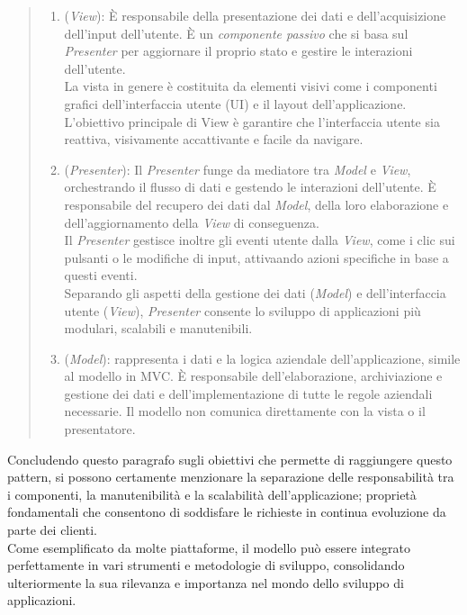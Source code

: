 \begin{quote}
\begin{enumerate}[label=\textit{\arabic*}]
\item (\textit{View}): È responsabile della presentazione dei dati e dell'acquisizione dell'input dell'utente. È un \textit{componente passivo} che si basa sul \textit{Presenter} per aggiornare il proprio stato e gestire le interazioni dell'utente. \\
La vista in genere è costituita da elementi visivi come i componenti grafici dell'interfaccia utente (UI) e il layout dell'applicazione.
L'obiettivo principale di View è garantire che l'interfaccia utente sia reattiva, visivamente accattivante e facile da navigare.
  
\item (\textit{Presenter}): Il \textit{Presenter} funge da mediatore tra \textit{Model} e \textit{View}, orchestrando il flusso di dati e gestendo le interazioni dell'utente. È responsabile del recupero dei dati dal \textit{Model}, della loro elaborazione e dell'aggiornamento della \textit{View} di conseguenza. \\
Il \textit{Presenter} gestisce inoltre gli eventi utente dalla \textit{View}, come i clic sui pulsanti o le modifiche di input, attivaando azioni specifiche in base a questi eventi. \\
Separando gli aspetti della gestione dei dati (\textit{Model}) e dell'interfaccia utente (\textit{View}), \textit{Presenter} consente lo sviluppo di applicazioni più modulari, scalabili e manutenibili.

\item (\textit{Model}):  rappresenta i dati e la logica aziendale dell'applicazione, simile al modello in MVC. È responsabile dell'elaborazione, archiviazione e gestione dei dati e dell'implementazione di tutte le regole aziendali necessarie. Il modello non comunica direttamente con la vista o il presentatore.
\end{enumerate} 
\end{quote}

Concludendo questo paragrafo sugli obiettivi che permette di raggiungere questo pattern, si possono certamente menzionare la separazione delle responsabilità tra i componenti, la manutenibilità e la scalabilità dell'applicazione; proprietà fondamentali che consentono di soddisfare le richieste in continua evoluzione da parte dei clienti. \\
\indent Come esemplificato da molte piattaforme, il modello può essere integrato perfettamente in vari strumenti e metodologie di sviluppo, consolidando ulteriormente la sua rilevanza e importanza nel mondo dello sviluppo di applicazioni.


